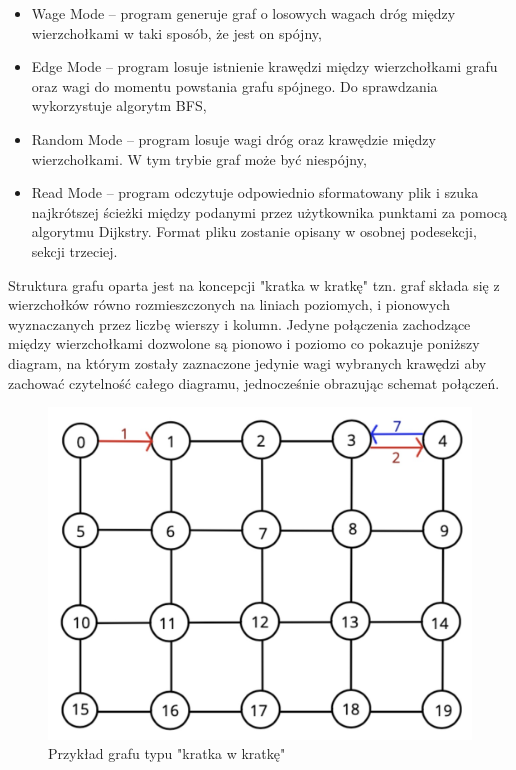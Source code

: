\documentclass[10pt, a4paper]{report}
\begin{document}
\begin{itemize}
    \item Wage Mode – program generuje graf o losowych wagach dróg między wierzchołkami w taki sposób, że jest on spójny,
    \item Edge Mode – program losuje istnienie krawędzi między wierzchołkami grafu oraz wagi do momentu powstania 
    grafu spójnego. Do sprawdzania wykorzystuje algorytm BFS,
    \item Random Mode – program losuje wagi dróg oraz krawędzie między wierzchołkami. W tym trybie graf może być niespójny,
    \item Read Mode -- program odczytuje odpowiednio sformatowany plik i szuka najkrótszej ścieżki
    między podanymi przez użytkownika punktami za pomocą algorytmu Dijkstry. Format pliku zostanie opisany w osobnej podesekcji, sekcji trzeciej.
\end{itemize}
Struktura grafu oparta jest na koncepcji "kratka w kratkę" tzn. graf składa się z wierzchołków równo rozmieszczonych na liniach poziomych, 
i pionowych wyznaczanych przez liczbę wierszy i kolumn. Jedyne połączenia zachodzące między wierzchołkami dozwolone są  pionowo i poziomo co pokazuje poniższy diagram, na którym zostały zaznaczone jedynie wagi wybranych krawędzi aby zachować czytelność całego diagramu, jednocześnie obrazując schemat połączeń.
\begin{figure}[h]
    \begin{center}
        \includegraphics[scale=0.15]{images/graph.png}
        \caption{Przykład grafu typu "kratka w kratkę"}
    \end{center}
\end{figure}
\newpage
\end{document}
